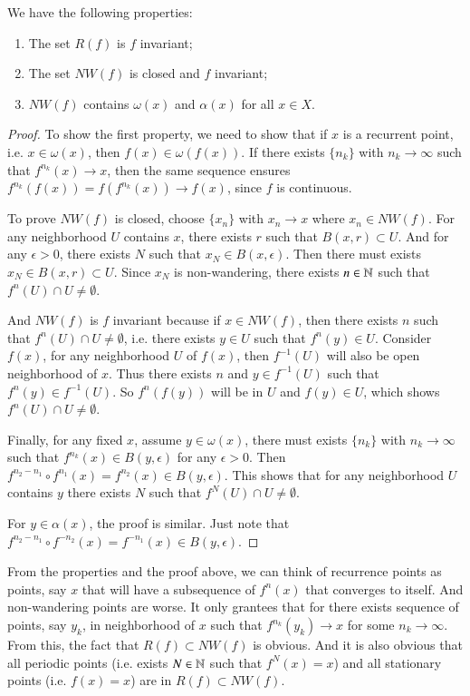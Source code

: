 \documentclass[12pt,a4paper]{article}
\begin{document}
	\begin{proposition}{}{}
		We have the following properties:
		\begin{enumerate}
			\item The set $R(f)$ is $f$ invariant;
			\item The set $NW(f)$ is closed and $f$ invariant;
			\item $NW(f)$ contains $\omega(x)$ and $\alpha(x)$ for all $x\in X$.
		\end{enumerate}
	\end{proposition}
	\begin{proof}
		To show the first property, we need to show that if $x$ is a recurrent point, i.e. $x\in \omega(x)$, then $f(x)\in \omega(f(x))$. If there exists $\{n_k\}$ with $n_k\to\infty$ such that $f^{n_k}(x)\to x$, then the same sequence ensures $f^{n_k}(f(x))=f(f^{n_k}(x))\to f(x)$, since $f$ is continuous.
		
		To prove $NW(f)$ is closed, choose $\{x_n\}$ with $x_n\to x$ where $x_n\in NW(f)$. For any neighborhood $U$ contains $x$, there exists $r$ such that $B(x,r)\subset U$. And for any $\epsilon>0$, there exists $N$ such that $x_N\in B(x,\epsilon)$. Then there must exists $x_N\in B(x,r)\subset U$. Since $x_N$ is non-wandering, there exists $n\in \mathbb{N}$ such that $f^n(U)\cap U\neq \emptyset$.
		
		And $NW(f)$ is $f$ invariant because if $x\in NW(f)$, then there exists $n$ such that $f^n(U)\cap U\neq \emptyset$, i.e. there exists $y\in U$ such that $f^n(y)\in U$. Consider $f(x)$, for any neighborhood $U$ of $f(x)$, then $f^{-1}(U)$ will also be open neighborhood of $x$. Thus there exists $n$ and $y\in f^{-1}(U)$ such that $f^n(y)\in f^{-1}(U)$. So $f^{n}(f(y))$ will be in $U$ and $f(y)\in U$, which shows $f^n(U)\cap U\neq \emptyset$. 
		
		Finally, for any fixed $x$, assume $y\in \omega(x)$, there must exists $\{n_k\}$ with $n_k\to\infty$ such that $f^{n_k}(x)\in B(y,\epsilon)$ for any $\epsilon>0$. Then $f^{n_2-n_1}\circ f^{n_1}(x)=f^{n_2}(x)\in B(y,\epsilon)$. This shows that for any neighborhood $U$ contains $y$ there exists $N$ such that $f^N(U)\cap U\neq \emptyset$.
		
		For $y\in \alpha(x)$, the proof is similar. Just note that $f^{n_2-n_1}\circ f^{-n_2}(x)=f^{-n_1}(x)\in B(y,\epsilon)$.
	\end{proof}
	
	From the properties and the proof above, we can think of recurrence points as points, say $x$ that will have a subsequence of $f^{n}(x)$ that converges to itself. And non-wandering points are worse. It only grantees that for there exists sequence of points, say $y_k$, in neighborhood of $x$ such that  $f^{n_k} (y_k) \to x$ for some $n_k\to \infty$. From this, the fact that $R(f)\subset NW(f)$ is obvious. And it is also obvious that all periodic points (i.e. exists $N\in \mathbb{N}$ such that $f^N(x)=x$) and all stationary points (i.e. $f(x)=x$) are in $R(f)\subset NW(f)$.
	
\end{document}
